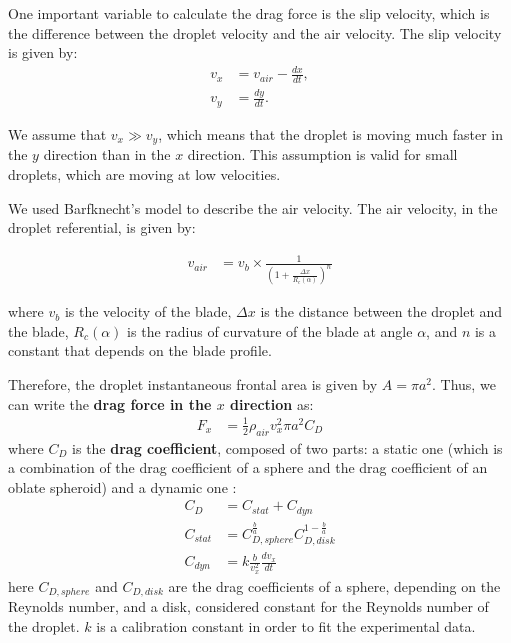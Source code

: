 \documentclass[10pt]{report}
\begin{document}
One important variable to calculate the drag force is the slip velocity, which is the difference between the droplet velocity and the air velocity. The slip velocity is given by:
\begin{align}
    v_{x} &= v_{air} - \frac{dx}{dt}, \\
    v_{y} &= \frac{dy}{dt}.
\end{align}

\par We assume that $v_{x}  \gg  v_{y}$, which means that the droplet is moving much faster in the $y$ direction than in the $x$ direction. This assumption is valid for small droplets, which are moving at low velocities.

\par We used Barfknecht's model \cite{Barfknecht2024} to describe the air velocity. The air velocity, in the droplet referential, is given by:

\begin{align}
    v_{air} &= v_{b} \times \frac{1}{\left(1+\frac{\Delta x}{R_c(\alpha)}\right)^{n}}
\end{align}

where $v_{b}$ is the velocity of the blade, $\Delta x$ is the distance between the droplet and the blade, $R_c(\alpha)$ is the radius of curvature of the blade at angle $\alpha$, and $n$ is a constant that depends on the blade profile.

Therefore, the droplet instantaneous frontal area is given by $A = \pi a^2$. Thus, we can write the \textbf{drag force in the $x$ direction} as:
\begin{align}
    F_x &= \frac{1}{2} \rho_{air} v_{x}^2 \pi a^2 C_D
\end{align}
where $C_D$ is the \textbf{drag coefficient}, composed of two parts: a static one (which is a combination of the drag coefficient of a sphere and the drag coefficient of an oblate spheroid) and a dynamic one :
\begin{align}
    C_D &= C_{stat} + C_{dyn} \\
    C_{stat} &= C_{D,sphere}^{\frac{b}{a}} C_{D,disk}^{1-\frac{b}{a}} \\
    C_{dyn} &= k \frac{b}{v_{x}^2}\frac{dv_{x}}{dt}
\end{align}
here $C_{D,sphere}$ and $C_{D,disk}$ are the drag coefficients of a sphere, depending on the Reynolds number, and a disk, considered constant for the Reynolds number of the droplet. $k$ is a calibration constant in order to fit the experimental data.
\end{document}

